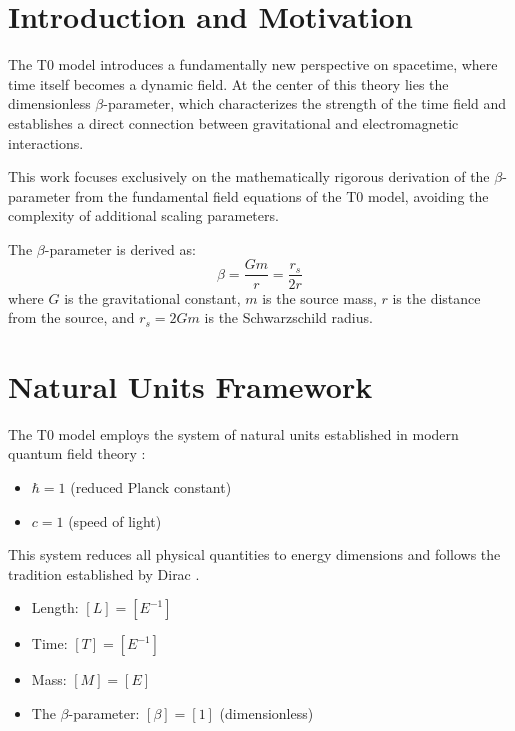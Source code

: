 \hfuzz=200pt

	\section{Introduction and Motivation}
	\label{sec:introduction}
	
	The T0 model introduces a fundamentally new perspective on spacetime, where time itself becomes a dynamic field. At the center of this theory lies the dimensionless $\beta$-parameter, which characterizes the strength of the time field and establishes a direct connection between gravitational and electromagnetic interactions.
	
	This work focuses exclusively on the mathematically rigorous derivation of the $\beta$-parameter from the fundamental field equations of the T0 model, avoiding the complexity of additional scaling parameters.
	
	\begin{tcolorbox}[colback=blue!5!white,colframe=blue!75!black,title=Central Result]
		The $\beta$-parameter is derived as:
		\begin{equation}
			\boxed{\beta = \frac{Gm}{r} = \frac{r_s}{2r}}
		\end{equation}
		where $G$ is the gravitational constant, $m$ is the source mass, $r$ is the distance from the source, and $r_s = 2Gm$ is the Schwarzschild radius.
	\end{tcolorbox}
	
	\section{Natural Units Framework}
	\label{sec:natural_units}
	
	The T0 model employs the system of natural units established in modern quantum field theory \citep{peskin1995,weinberg1995}:
	
	\begin{itemize}
		\item $\hbar = 1$ (reduced Planck constant)
		\item $c = 1$ (speed of light)
	\end{itemize}
	
	This system reduces all physical quantities to energy dimensions and follows the tradition established by Dirac \citep{dirac1958}.
	
	\begin{tcolorbox}[colback=blue!5!white,colframe=blue!75!black,title=Dimensions in Natural Units]
		\begin{itemize}
			\item Length: $[L] = [E^{-1}]$
			\item Time: $[T] = [E^{-1}]$ 
			\item Mass: $[M] = [E]$
			\item The $\beta$-parameter: $[\beta] = [1]$ (dimensionless)
		\end{itemize}
	\end{tcolorbox}
	
